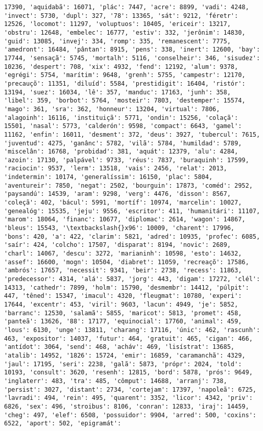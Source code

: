 \documentclass[11pt]{article}
\begin{document}
\begin{Verbatim}[commandchars=\\\{\}]
17390, 'aquidabã': 16071, 'plác': 7447, 'acre': 8899, 'vadi': 4248, 'invect': 5730, 'dupl': 327, '78': 13365, 'sát': 9212, 'féretr': 12526, 'locomot': 11297, 'voluptuos': 10405, 'ericeir': 13217, 'obstru': 12648, 'embelec': 16777, 'estiv': 332, 'jerônim': 14830, 'guid': 13085, 'invej': 334, 'romp': 335, 'remanescent': 7775, 'amedront': 16484, 'pântan': 8915, 'pens': 338, 'inert': 12600, 'bay': 17744, 'sensaçã': 5745, 'mortalh': 5116, 'conselheir': 346, 'sisudez': 10236, 'despert': 708, 'xix': 4932, 'fend': 12192, 'alum': 9378, 'egrégi': 5754, 'marítim': 9648, 'grenh': 5755, 'campestr': 12170, 'precauçõ': 11351, 'diluíd': 5584, 'prestidigit': 16404, 'ristór': 13194, 'suez': 16034, 'lê': 357, 'manduc': 17163, 'junh': 358, 'libel': 359, 'borbot': 5764, 'mosteir': 7803, 'destemper': 15574, 'mago': 361, 'sra': 362, 'honneur': 13204, 'virtual': 7806, 'alagoinh': 16116, 'instituiçã': 5771, 'ondin': 15256, 'colaçã': 15501, 'nasal': 5773, 'calderón': 9598, 'compact': 6643, 'gamel': 11162, 'enfin': 16011, 'desment': 372, 'deus': 3927, 'tubercul': 7615, 'juventud': 4275, 'ganânc': 5782, 'vilã': 5784, 'humildad': 5789, 'miscelân': 16768, 'probidad': 381, 'aquát': 12379, 'alu': 4284, 'azoin': 17130, 'palpável': 9733, 'réus': 7837, 'buraquinh': 17599, 'raciocin': 9537, 'lerm': 13518, 'vais': 2456, 'relat': 2013, 'indetermin': 10174, 'generalíssim': 16150, 'plac': 5804, 'aventureir': 7850, 'negat': 2502, 'bourguin': 17873, 'coméd': 2952, 'paysandú': 14539, 'aram': 9298, 'verg': 4476, 'disson': 8567, 'coleçã': 402, 'bácul': 5991, 'mortíf': 10974, 'marcelin': 10027, 'genealóg': 15535, 'jeju': 9556, 'escritor': 411, 'humanitári': 11107, 'marom': 18064, 'financ': 10677, 'diplomac': 2614, 'wagon': 14867, 'bleus': 15543, '\textbackslash{}x96': 10009, 'charent': 17996, 'bons': 420, 'a': 422, 'clarim': 5821, 'adred': 10935, 'profec': 6085, 'saír': 424, 'colcho': 17507, 'disparat': 8194, 'novic': 2689, 'charl': 14067, 'descu': 3272, 'marianinh': 10598, 'esto': 14632, 'assef': 16600, 'mogn': 10504, 'diabret': 11059, 'recreaçõ': 17586, 'ambrós': 17657, 'necessit': 9341, 'beir': 2738, 'recess': 11863, 'predecessor': 4314, 'alá': 5837, 'jorg': 443, 'digam': 17272, 'clél': 14313, 'cathedr': 7899, 'holm': 15790, 'desmembr': 14412, 'púlpit': 447, 'têned': 15347, 'imacul': 4320, 'fleugmat': 10780, 'experi': 17644, 'excentr': 453, 'viril': 9603, 'lacun': 4949, 'je': 5852, 'barranc': 12530, 'salamã': 5855, 'maricot': 5813, 'promet': 458, 'panteã': 13626, '88': 17177, 'equinocial': 17760, 'animal': 459, 'lous': 6130, 'unge': 13811, 'charang': 17116, 'únic': 462, 'rascunh': 463, 'expositor': 14037, 'futur': 464, 'gratuit': 465, 'cigan': 466, 'antídot': 3064, 'send': 468, 'acháv': 469, 'lisístrat': 13685, 'atalib': 14952, '1826': 15724, 'emir': 16859, 'caramanchã': 4329, 'jaul': 17195, 'seri': 2238, 'galã': 5873, 'própr': 2024, 'told': 10193, 'consult': 3620, 'resenh': 12815, 'bord': 5878, 'prós': 9649, 'inglaterr': 483, 'tra': 485, 'cômput': 14688, 'arranj': 738, 'persist': 3027, 'distant': 2734, 'cortejam': 17397, 'napoleã': 6725, 'lavradi': 494, 'rein': 495, 'quarent': 3352, 'licor': 4342, 'priv': 6826, 'sex': 496, 'stroibus': 8106, 'conran': 12833, 'iraj': 14459, 'cheg': 497, 'elef': 6508, 'possuidor': 9904, 'arred': 500, 'coxins': 6522, 'aport': 502, 'epigramát': 
\end{Verbatim}
\end{document}
